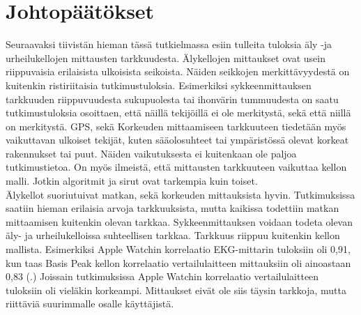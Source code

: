 \documentclass[utf8,bachelor,finnish]{bachelor}
\begin{document}
    
  
  
\chapter{Johtopäätökset}

Seuraavaksi tiivistän hieman tässä tutkielmassa esiin tulleita tuloksia äly -ja urheilukellojen mittausten tarkkuudesta.
 Älykellojen mittaukset ovat usein riippuvaisia erilaisista ulkoisista seikoista. Näiden seikkojen merkittävyydestä on kuitenkin ristiriitaisia tutkimustuloksia.
  Esimerkiksi sykkeenmittauksen tarkkuuden riippuvuudesta sukupuolesta tai ihonvärin tummuudesta on saatu tutkimustuloksia
   osoittaen, että näillä tekijöillä ei ole merkitystä, sekä että niillä on merkitystä. GPS, sekä Korkeuden mittaamiseen tarkkuuteen tiedetään myös vaikuttavan
    ulkoiset tekijät, kuten sääolosuhteet tai ympäristössä olevat korkeat rakennukset tai puut. Näiden vaikutuksesta ei kuitenkaan ole paljoa tutkimustietoa.
     On myös ilmeistä, että mittausten tarkkuuteen vaikuttaa kellon malli. Jotkin algoritmit ja sirut ovat tarkempia kuin toiset.\\

Älykellot suoriutuivat matkan, sekä korkeuden mittauksista hyvin. Tutkimuksissa saatiin hieman erilaisia arvoja tarkkuuksista, mutta kaikissa
 todettiin matkan mittaamisen kuitenkin olevan tarkkaa. Sykkeenmittauksen voidaan todeta olevan äly- ja urheilukelloissa suhteellisen tarkkaa. Tarkkuus riippuu kuitenkin kellon mallista.
 Esimerkiksi Apple Watchin korrelaatio EKG-mittarin tuloksiin oli 0,91, kun taas Basis Peak kellon korrelaatio vertailulaitteen mittauksiin
  oli ainoastaan 0,83 (\cite{wang_accuracy_2017}.) Joissain tutkimuksissa Apple Watchin korrelaatio vertailulaitteen tuloksiin oli vieläkin korkeampi.
   Mittaukset eivät ole siis täysin tarkkoja, mutta riittäviä suurimmalle osalle käyttäjistä.\\
\end{document}
